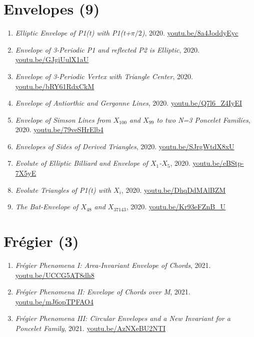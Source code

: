\documentclass[12pt]{article}
\begin{document}
\section{Envelopes (9)}

\begin{enumerate}[resume]
\item \textit{Elliptic Envelope of P1(t) with P1(t+$\pi/2$)}, 2020. \href{https://youtu.be/8a4JoddyEyc}{\url{youtu.be/8a4JoddyEyc}}
\item \textit{Envelope of 3-Periodic P1 and reflected P2 is Elliptic}, 2020. \href{https://youtu.be/GJgiUulX1aU}{\url{youtu.be/GJgiUulX1aU}}
\item \textit{Envelope of 3-Periodic Vertex with Triangle Center}, 2020. \href{https://youtu.be/bRY61RdxCkM}{\url{youtu.be/bRY61RdxCkM}}
\item \textit{Envelope of Antiorthic and Gergonne Lines}, 2020. \href{https://youtu.be/Q7l6_Z4IyEI}{\url{youtu.be/Q7l6\_Z4IyEI}}
\item \textit{Envelope of Simson Lines from $X_{100}$ and $X_{99}$ to two N=3 Poncelet Families}, 2020. \href{https://youtu.be/79veSHrElb4}{\url{youtu.be/79veSHrElb4}}
\item \textit{Envelopes of Sides of Derived Triangles}, 2020. \href{https://youtu.be/SJrgWtdX8xU}{\url{youtu.be/SJrgWtdX8xU}}
\item \textit{Evolute of Elliptic Billiard and Envelope of $X_{1}$-$X_{5}$}, 2020. \href{https://youtu.be/eBStp-7X5yE}{\url{youtu.be/eBStp-7X5yE}}
\item \textit{Evolute Triangles of P1(t) with $X_i$}, 2020. \href{https://youtu.be/DhqDdMAlBZM}{\url{youtu.be/DhqDdMAlBZM}}
\item \textit{The Bat-Envelope of $X_{48}$ and $X_{37143}$}, 2020. \href{https://youtu.be/Kr93eFZnB_U}{\url{youtu.be/Kr93eFZnB\_U}}
\end{enumerate}

\section{Frégier (3)}

\begin{enumerate}[resume]
\item \textit{Frégier Phenomena I: Area-Invariant Envelope of Chords}, 2021. \href{https://youtu.be/UCCG5AT8dh8}{\url{youtu.be/UCCG5AT8dh8}}
\item \textit{Frégier Phenomena II: Envelope of Chords over M}, 2021. \href{https://youtu.be/mJ6opTPFAO4}{\url{youtu.be/mJ6opTPFAO4}}
\item \textit{Frégier Phenomena III: Circular Envelopes and a New Invariant for a Poncelet Family}, 2021. \href{https://youtu.be/AzNXeBU2NTI}{\url{youtu.be/AzNXeBU2NTI}}
\end{enumerate}
\end{document}
